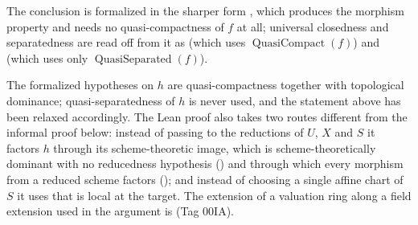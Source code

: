 \begin{lemma}
  The conclusion is formalized in the sharper form
  \texttt{},
  which produces the morphism property
  \texttt{} and needs no
  quasi-compactness of $f$ at all; universal closedness and separatedness are read off
  from it as
  \texttt{}
  (which uses $\operatorname{QuasiCompact}(f)$) and
  \texttt{}
  (which uses only $\operatorname{QuasiSeparated}(f)$).

  The formalized hypotheses on $h$ are quasi-compactness together with topological
  dominance; quasi-separatedness of $h$ is never used, and the statement above has been
  relaxed accordingly.  The Lean proof also takes two routes different from the informal
  proof below: instead of passing to the reductions of $U$, $X$ and $S$ it factors $h$
  through its scheme-theoretic image, which is scheme-theoretically dominant with no
  reducedness hypothesis
  (\texttt{}) and through which every
  morphism from a reduced scheme factors
  (\texttt{});
  and instead of choosing a single affine chart of $S$ it uses that
  \texttt{} is local at the
  target.  The extension of a valuation ring along a field extension used in the argument
  is \texttt{} (Tag 00IA).
\end{lemma}

